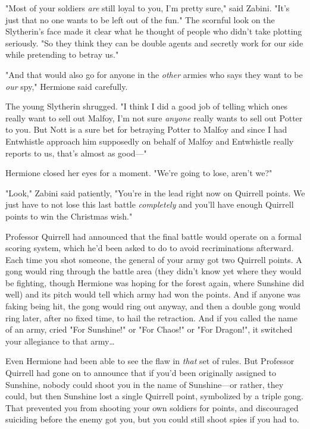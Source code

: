 "Most of your soldiers \emph{are} still loyal to you, I'm pretty sure," said
Zabini. "It's just that no one wants to be left out of the fun." The scornful
look on the Slytherin's face made it clear what he thought of people who didn't
take plotting seriously. "So they think they can be double agents and secretly
work for our side while pretending to betray us."

"And that would also go for anyone in the \emph{other} armies who says they
want to be \emph{our} spy," Hermione said carefully.

The young Slytherin shrugged. "I think I did a good job of telling which ones
really want to sell out Malfoy, I'm not sure \emph{anyone} really wants to sell
out Potter to you. But Nott is a sure bet for betraying Potter to Malfoy and
since I had Entwhistle approach him supposedly on behalf of Malfoy and
Entwhistle really reports to us, that's almost as good---"

Hermione closed her eyes for a moment. "We're going to lose, aren't we?"

"Look," Zabini said patiently, "You're in the lead right now on Quirrell
points. We just have to not lose this last battle \emph{completely} and you'll
have enough Quirrell points to win the Christmas wish."

Professor Quirrell had announced that the final battle would operate on a
formal scoring system, which he'd been asked to do to avoid recriminations
afterward. Each time you shot someone, the general of your army got two
Quirrell points. A gong would ring through the battle area (they didn't know
yet where they would be fighting, though Hermione was hoping for the forest
again, where Sunshine did well) and its pitch would tell which army had won the
points. And if anyone was faking being hit, the gong would ring out anyway, and
then a double gong would ring later, after no fixed time, to hail the
retraction. And if you called the name of an army, cried "For Sunshine!" or
"For Chaos!" or "For Dragon!", it switched your allegiance to that army…

Even Hermione had been able to see the flaw in \emph{that} set of rules. But
Professor Quirrell had gone on to announce that if you'd been originally
assigned to Sunshine, nobody could shoot you in the name of Sunshine---or
rather, they could, but then Sunshine lost a single Quirrell point, symbolized
by a triple gong. That prevented you from shooting your own soldiers for
points, and discouraged suiciding before the enemy got you, but you could still
shoot spies if you had to.

